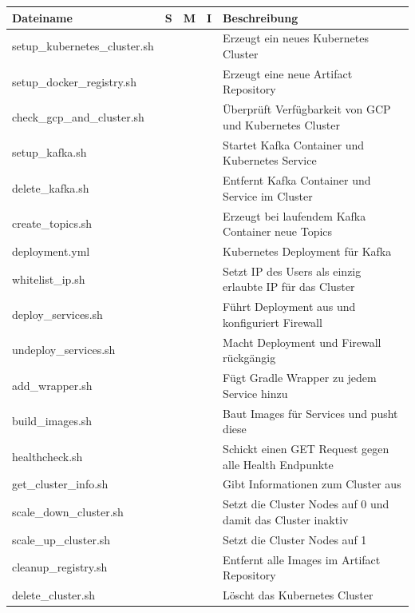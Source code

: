 \newpage

\begin{table}[h]
\centering
\footnotesize
\begin{tabularx}{\textwidth}{ | l | c | c | c | X | }
\hline
\textbf{Dateiname} & \textbf{S} & \textbf{M} & \textbf{I} & \textbf{Beschreibung} \\ 
\hline
setup_kubernetes_cluster.sh &  &  &  & Erzeugt ein neues Kubernetes Cluster \\ 
\hline
setup_docker_registry.sh &  &  &  & Erzeugt eine neue Artifact Repository \\ 
\hline
check_gcp_and_cluster.sh &  &  &  & Überprüft Verfügbarkeit von GCP und Kubernetes Cluster \\ 
\hline
setup_kafka.sh &  &  &  & Startet Kafka Container und Kubernetes Service \\
\hline
delete_kafka.sh &  &  &  & Entfernt Kafka Container und Service im Cluster \\ 
\hline
create_topics.sh &  &  &  & Erzeugt bei laufendem Kafka Container neue Topics \\ 
\hline
deployment.yml &  &  &  & Kubernetes Deployment für Kafka \\ 
\hline
whitelist_ip.sh &  &  &  & Setzt IP des Users als einzig erlaubte IP für das Cluster \\ 
\hline
deploy_services.sh &  &  &  & Führt Deployment aus und konfiguriert Firewall \\ 
\hline
undeploy_services.sh &  &  &  & Macht Deployment und Firewall rückgängig \\ 
\hline
add_wrapper.sh &  &  &  & Fügt Gradle Wrapper zu jedem Service hinzu \\ 
\hline
build_images.sh &  &  &  & Baut Images für Services und pusht diese \\ 
\hline
healthcheck.sh &  &  &  & Schickt einen GET Request gegen alle Health Endpunkte \\
\hline
get_cluster_info.sh &  &  &  & Gibt Informationen zum Cluster aus \\ 
\hline
scale_down_cluster.sh &  &  &  & Setzt die Cluster Nodes auf 0 und damit das Cluster inaktiv \\ 
\hline
scale_up_cluster.sh &  &  &  & Setzt die Cluster Nodes auf 1 \\ 
\hline
cleanup_registry.sh &  &  &  & Entfernt alle Images im Artifact Repository \\ 
\hline
delete_cluster.sh &  &  &  & Löscht das Kubernetes Cluster \\ 

\end{tabularx}
\end{table}

